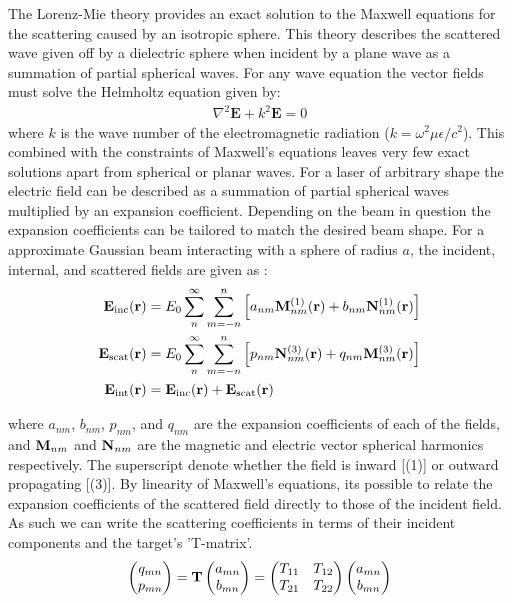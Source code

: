 The Lorenz-Mie theory provides an exact solution to the Maxwell 
equations for the scattering caused by an isotropic sphere. This 
theory describes the scattered wave given off by a dielectric 
sphere when incident by a plane wave as a summation of partial 
spherical waves. For any wave equation the vector fields must 
solve the Helmholtz equation given by:
\begin{align}
	\nabla^2\mathbf{E} +k^2\mathbf{E} = 0
\end{align} 
where $k$ is the wave number of the electromagnetic radiation 
($k = \omega^2 \mu \epsilon/c^2$). This combined with the constraints of 
Maxwell's equations leaves very few exact solutions apart from 
spherical or planar waves. For a laser of arbitrary shape the 
electric field can be described as a summation of partial 
spherical waves multiplied by an expansion coefficient. Depending 
on the beam in question the expansion coefficients can be tailored
to match the desired beam shape. For a approximate Gaussian beam 
interacting with a sphere of radius $a$, the incident, internal, 
and scattered fields are given as \cite{RanhaNeves2019}: 
\begin{align}
	\label{eq:incident}
	{\bf E}_{\rm inc}({\bf r})
	&=
	E_0 \sum_{n}^\infty\sum_{m=-n}^n \left[
	a_{nm}{\bf M}_{nm}^{(1)}({\bf r})
	+ b_{nm}{\bf N}_{nm}^{(1)}({\bf r})\right]
	\\
	\label{eq:scattered}
	{\bf E}_{\rm scat}({\bf r})
	&=
	E_0 \sum_{n}^\infty \sum_{m=-n}^n\left[
	p_{nm}{\bf N}_{nm}^{(3)}({\bf r})+q_{nm}{\bf M}_{nm}^{(3)}({\bf r})
	\right] 
	\\
	\label{eq:internal}
	{\bf E}_{\rm int}({\bf r})
	&=
	{\bf E}_{\rm inc}({\bf r}) + {\bf E}_{\rm scat}({\bf r})
\end{align}

where $a_{nm}$, $b_{nm}$, $p_{nm}$, and $q_{nm}$
are the expansion coefficients of each of the fields, and ${\bf M}_
{nm}$ and ${\bf N}_{nm}$ are the magnetic and electric vector 
spherical harmonics respectively. The superscript denote whether 
the field is inward [(1)] or outward propagating [(3)]. By linearity 
of Maxwell's equations, its possible to relate the expansion 
coefficients of the scattered field directly to those of the incident 
field. As such we can write the scattering coefficients in terms of 
their incident components and the target's 'T-matrix'.
\begin{align}
	\label{eq:t_matrix}
	\begin{pmatrix}
		q_{mn} \\
		p_{mn} 
	\end{pmatrix}
	= \bold{T} 
	\begin{pmatrix}
		a_{mn} \\
		b_{mn}
	\end{pmatrix}
	= \begin{pmatrix}
		T_{11} & T_{12} \\
		T_{21} & T_{22}
	\end{pmatrix}
	\begin{pmatrix}
		a_{mn} \\
		b_{mn}
	\end{pmatrix}
\end{align}

